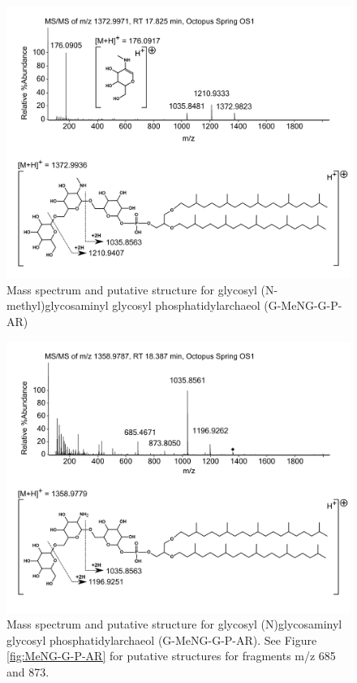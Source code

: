 \begin{figure}[h]
\centering
\includegraphics[width=\linewidth]{figs_app1/G-MeNG-G-P-AR}
\caption{Mass spectrum and putative structure for glycosyl (N-methyl)glycosaminyl glycosyl phosphatidylarchaeol (G-MeNG-G-P-AR)}
\label{fig:G-MeNG-G-P-AR}
\end{figure}

\begin{figure}[h]
\centering
\includegraphics[width=\linewidth]{figs_app1/G-NG-G-P-AR}
\caption{Mass spectrum and putative structure for glycosyl (N)glycosaminyl glycosyl phosphatidylarchaeol (G-MeNG-G-P-AR). See Figure \ref{fig:MeNG-G-P-AR} for putative structures for fragments m/z 685 and 873.}
\label{fig:G-NG-G-P-AR}
\end{figure}



